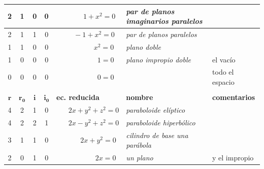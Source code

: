 \documentclass[12pt]{report}
\theoremstyle{definition}
\theoremstyle{definition}
\theoremstyle{remark}
\begin{document}
\begin{center}
\begin{tabular}{|c|c|c|c|m{3cm}|m{5.4cm}|m{2.7cm}|}
     \hline
     2 & 1 & 0 & 0 & $\phantom{+y^2+z^2} 1+x^2=0$ & \textit{par de planos imaginarios paralelos} & \scriptsize \\
     \hline
     2 & 1 & 1 & 0 & $\ \; \, \phantom{y^2z^2}-1+x^2=0$ & \textit{par de planos paralelos} & \scriptsize \\
     \hline
     1 & 1 & 0 & 0 & $\ \ \, \, \, \, \, \, \, \, \phantom{y^2z^2-1}x^2=0$ & \textit{plano doble} & \scriptsize \\
     \hline
     1 & 0 & 0 & 0 & $\ \ \, \, \, \, \, \, \, \, \, \, \, \phantom{y^2z^2-1}1=0$ & \textit{plano impropio doble} & \scriptsize el vacío \\
     \hline
     0 & 0 & 0 & 0 & $\ \ \, \, \, \, \, \, \, \, \, \, \, \phantom{y^2z^2-1}0=0$ & \textit{} & \scriptsize todo el espacio \\
     \hline
     \rowcolor{Green4} \multicolumn{7}{|c|}{\textcolor{white}{\textbf{paraboloides}}} \\
     \hline
     $\mathbf{r}$ & $\mathbf{r_0}$ & $\mathbf{i}$ & $\mathbf{i_0}$ & \centering \textbf{ec. reducida} & \centering \textbf{nombre} & \centering \textbf{comentarios} \tabularnewline
     \hline
     4 & 2 & 1 & 0 & $\phantom{1+^2}2x+y^2+z^2=0$ & \textit{paraboloide elíptico} & \scriptsize \\
     \hline
     4 & 2 & 2 & 1 & $\phantom{1+^2}2x-y^2+z^2=0$ & \textit{paraboloide hiperbólico} & \scriptsize \\
     \hline
     3 & 1 & 1 & 0 & $\phantom{1+^2-z}2x+y^2=0$ & \textit{cilindro de base una parábola} & \scriptsize \\
     \hline
     2 & 0 & 1 & 0 & $\, \, \, \, \, \, \, \phantom{1^2-z+y}2x=0$ & \textit{un plano} & \scriptsize y el impropio \\
     \hline
\end{tabular}

\end{center}
\end{document}
